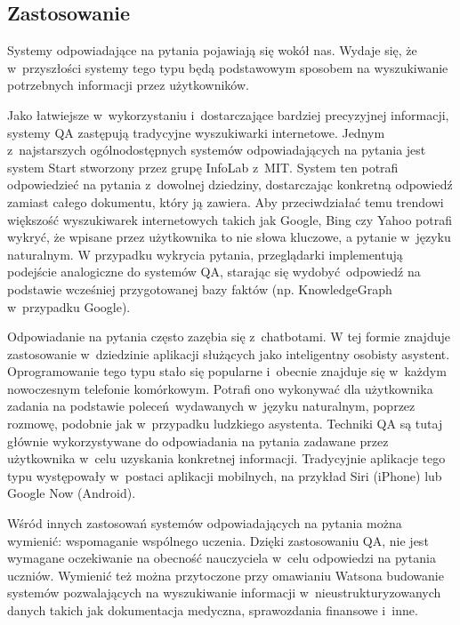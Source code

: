 \documentclass[a4paper, twoside, openright, 12pt]{report}
\begin{document}
        \subsection{Zastosowanie}
            Systemy odpowiadające na pytania pojawiają się wokół nas. Wydaje się, że w~przyszłości systemy tego typu będą
            podstawowym sposobem na wyszukiwanie potrzebnych informacji przez użytkowników.

            Jako łatwiejsze w~wykorzystaniu i~dostarczające bardziej precyzyjnej informacji, systemy QA zastępują tradycyjne
            wyszukiwarki internetowe. Jednym z~najstarszych ogólnodostępnych systemów odpowiadających na pytania jest
            system Start stworzony przez grupę InfoLab z~MIT. System ten potrafi odpowiedzieć na pytania z~dowolnej
            dziedziny, dostarczając konkretną odpowiedź zamiast całego dokumentu, który ją zawiera.
            Aby przeciwdziałać temu trendowi  większość wyszukiwarek internetowych takich jak Google, Bing czy Yahoo
            potrafi wykryć, że wpisane przez użytkownika to nie słowa kluczowe, a pytanie w~języku naturalnym.
            W przypadku wykrycia pytania, przeglądarki implementują podejście analogiczne do systemów QA, starając się
            wydobyć odpowiedź na podstawie wcześniej przygotowanej bazy faktów (np. KnowledgeGraph w~przypadku Google).

            Odpowiadanie na pytania często zazębia się z~chatbotami. W tej formie znajduje zastosowanie w~dziedzinie
            aplikacji służących jako inteligentny
            osobisty asystent. Oprogramowanie tego typu stało się popularne i~obecnie znajduje się w~każdym nowoczesnym
            telefonie komórkowym. Potrafi ono wykonywać dla użytkownika zadania na podstawie poleceń wydawanych w~języku
            naturalnym, poprzez rozmowę, podobnie jak w~przypadku ludzkiego asystenta. Techniki QA są tutaj głównie
            wykorzystywane do odpowiadania na pytania zadawane przez użytkownika w~celu uzyskania konkretnej informacji.
            Tradycyjnie aplikacje tego typu występowały w~postaci aplikacji mobilnych, na przykład Siri (iPhone) lub
            Google Now (Android).

            Wśród innych zastosowań systemów odpowiadających na pytania można wymienić: wspomaganie wspólnego
            uczenia\cite{COLLABORATIVELEARNING}. Dzięki zastosowaniu QA, nie jest wymagane oczekiwanie na obecność nauczyciela
            w~celu odpowiedzi na pytania uczniów. Wymienić też można przytoczone przy omawianiu Watsona budowanie systemów
            pozwalających na wyszukiwanie informacji w~nieustrukturyzowanych danych takich jak dokumentacja medyczna,
            sprawozdania finansowe i~inne.
\end{document}
